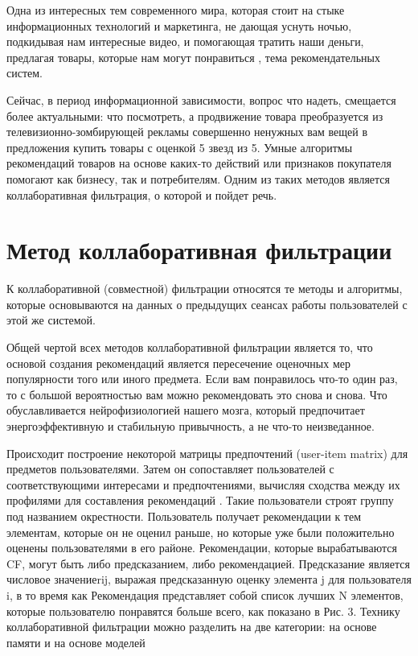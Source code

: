 \documentclass[bachelor, och, referat]{shiza}
\begin{document}
\tableofcontents

\intro

Одна из интересных тем современного мира, которая стоит на стыке информационных технологий и маркетинга,
не дающая уснуть ночью, подкидывая нам интересные видео, и помогающая тратить наши деньги, предлагая товары,
которые нам \glqq могут понравиться \grqq, тема рекомендательных систем. 

Сейчас, в период информационной зависимости, вопрос 
\glqq что надеть\grqq, смещается более актуальными: \glqq что посмотреть\grqq, а продвижение товара преобразуется из 
телевизионно-зомбирующей рекламы совершенно ненужных вам вещей в предложения купить товары с оценкой 5 звезд 
из 5. Умные алгоритмы рекомендаций товаров на основе каких-то действий или признаков покупателя помогают как бизнесу, 
так и потребителям. Одним из таких методов является коллаборативная фильтрация, о которой и пойдет речь.


\section{Метод коллаборативная фильтрации}
К коллаборативной (совместной) фильтрации относятся те методы и
алгоритмы, которые основываются на данных о
предыдущих сеансах работы пользователей с этой же
системой.

Общей чертой всех методов коллаборативной фильтрации является то, что основой создания
рекомендаций является пересечение оценочных мер популярности того или иного предмета. Если вам понравилось что-то один раз, 
то с большой вероятностью вам можно рекомендовать это снова и снова. Что обуславливается нейрофизиологией нашего мозга, 
который предпочитает энергоэффективную и стабильную привычность, а не что-то неизведанное.


Происходит построение некоторой матрицы предпочтений (user-item matrix) 
для предметов пользователями. Затем он сопоставляет пользователей с 
соответствующими интересами и предпочтениями, вычисляя сходства между их профилями
 для составления рекомендаций . Такие пользователи строят группу под названием 
 окрестности. Пользователь получает рекомендации к тем элементам, которые он не оценил 
 раньше, но которые уже были положительно оценены пользователями в его районе. 
 Рекомендации, которые вырабатываются CF, могут быть либо предсказанием, либо 
 рекомендацией. Предсказание является числовое значениеrij, выражая предсказанную 
 оценку элемента j для пользователя i, в то время как Рекомендация представляет 
 собой список лучших N элементов, которые пользователю понравятся больше всего, 
 как показано в Рис. 3. Технику коллаборативной фильтрации можно разделить на две
  категории: на основе памяти и на основе моделей 
\end{document}
